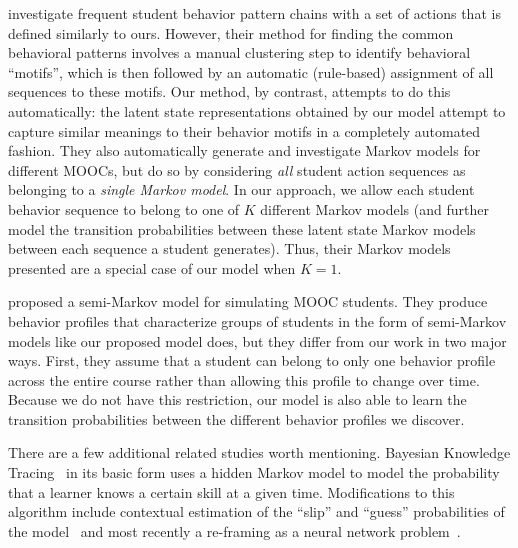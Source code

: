 \citet{Davis:2016:EDM} investigate frequent student behavior pattern chains
with a set of actions that is defined similarly to ours. However, their
method for finding the common behavioral patterns involves a manual
clustering step to identify behavioral ``motifs'', which is then followed
by an automatic (rule-based) assignment of all sequences to these motifs.
Our method, by contrast, attempts to do this automatically: the latent
state representations obtained by our model attempt to capture similar
meanings to their behavior motifs in a completely automated fashion. They
also automatically generate and investigate Markov models for different
MOOCs, but do so by considering \emph{all} student action sequences as
belonging to a \emph{single Markov model}. In our approach, we allow each
student behavior sequence to belong to one of $K$ different Markov models
(and further model the transition probabilities between these latent state
Markov models between each sequence a student generates). Thus, their
Markov models presented are a special case of our model when $K = 1$.

\citet{Faucon:2016:EDM} proposed a semi-Markov model for simulating MOOC
students. They produce behavior profiles that characterize groups of
students in the form of semi-Markov models like our proposed model does,
but they differ from our work in two major ways. First, they assume that a
student can belong to only one behavior profile across the entire course
rather than allowing this profile to change over time.  Because we do not
have this restriction, our model is also able to learn the transition
probabilities between the different behavior profiles we discover.

There are a few additional related studies worth mentioning.
Bayesian Knowledge Tracing~\cite{Corbett:1994:UMUAI} in its basic form uses
a hidden Markov model to model the probability that a learner knows a
certain skill at a given time. Modifications to this algorithm include
contextual estimation of the ``slip'' and ``guess'' probabilities of the
model~\cite{Baker:2008:ITS} and most recently a re-framing as a neural
network problem~\cite{Piech:2015:NIPS}.

